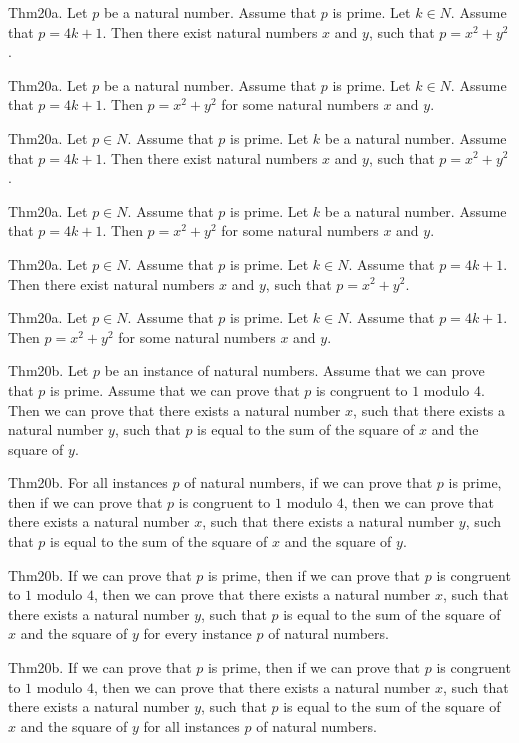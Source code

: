 \documentclass{article}
\begin{document}
Thm20a. Let $p$ be a natural number. Assume that $p$ is prime. Let $k \in N$. Assume that $p = 4 k + 1$. Then there exist natural numbers $x$ and $y$, such that $p = x ^{ 2}+ y ^{ 2}$.

Thm20a. Let $p$ be a natural number. Assume that $p$ is prime. Let $k \in N$. Assume that $p = 4 k + 1$. Then $p = x ^{ 2}+ y ^{ 2}$ for some natural numbers $x$ and $y$.

Thm20a. Let $p \in N$. Assume that $p$ is prime. Let $k$ be a natural number. Assume that $p = 4 k + 1$. Then there exist natural numbers $x$ and $y$, such that $p = x ^{ 2}+ y ^{ 2}$.

Thm20a. Let $p \in N$. Assume that $p$ is prime. Let $k$ be a natural number. Assume that $p = 4 k + 1$. Then $p = x ^{ 2}+ y ^{ 2}$ for some natural numbers $x$ and $y$.

Thm20a. Let $p \in N$. Assume that $p$ is prime. Let $k \in N$. Assume that $p = 4 k + 1$. Then there exist natural numbers $x$ and $y$, such that $p = x ^{ 2}+ y ^{ 2}$.

Thm20a. Let $p \in N$. Assume that $p$ is prime. Let $k \in N$. Assume that $p = 4 k + 1$. Then $p = x ^{ 2}+ y ^{ 2}$ for some natural numbers $x$ and $y$.

Thm20b. Let $p$ be an instance of natural numbers. Assume that we can prove that $p$ is prime. Assume that we can prove that $p$ is congruent to $1$ modulo $4$. Then we can prove that there exists a natural number $x$, such that there exists a natural number $y$, such that $p$ is equal to the sum of the square of $x$ and the square of $y$.

Thm20b. For all instances $p$ of natural numbers, if we can prove that $p$ is prime, then if we can prove that $p$ is congruent to $1$ modulo $4$, then we can prove that there exists a natural number $x$, such that there exists a natural number $y$, such that $p$ is equal to the sum of the square of $x$ and the square of $y$.

Thm20b. If we can prove that $p$ is prime, then if we can prove that $p$ is congruent to $1$ modulo $4$, then we can prove that there exists a natural number $x$, such that there exists a natural number $y$, such that $p$ is equal to the sum of the square of $x$ and the square of $y$ for every instance $p$ of natural numbers.

Thm20b. If we can prove that $p$ is prime, then if we can prove that $p$ is congruent to $1$ modulo $4$, then we can prove that there exists a natural number $x$, such that there exists a natural number $y$, such that $p$ is equal to the sum of the square of $x$ and the square of $y$ for all instances $p$ of natural numbers.
\end{document}
